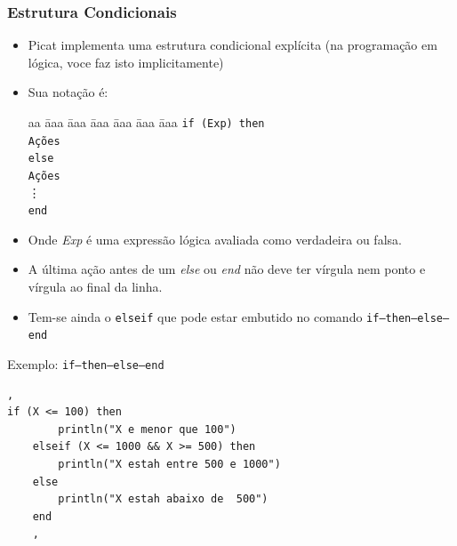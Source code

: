 \begin{frame}[fragile]
\frametitle{Estrutura Condicionais}
    
    \begin{itemize}
        
        \item Picat implementa uma  estrutura condicional explícita (na programação em lógica, voce faz isto implicitamente)
        
        \pause
        \item Sua notação é:\\
        
        \begin{tabbing}
            aa \= aaa \= aaa \= aaa \= aaa \= aaa \= aaa \kill
            \> \texttt{if (Exp) then}\\
            \> \> \texttt{Ações} \\
            \> \texttt{else}\\
            \> \> \texttt{Ações}\\
            \> \vdots\\
            \> \texttt{end} 
        \end{tabbing}
        
        \pause
        \item Onde \emph{Exp} é uma expressão lógica  avaliada como verdadeira ou  falsa.
     
     \pause   
        \item A última ação antes de um \emph{else} ou \emph{end} não deve ter  vírgula nem ponto e vírgula ao final da linha.
  
     \pause   
        \item Tem-se ainda o \texttt{elseif} que pode estar embutido no comando \texttt{if--then--else--end}
        
    \end{itemize}
\end{frame}    
    
    
\begin{frame}[fragile]

\begin{block}{Exemplo: \texttt{if--then--else--end} }
     
\begin{lstlisting}[frame=single]
    ,
if (X <= 100) then
        println("X e menor que 100")
    elseif (X <= 1000 && X >= 500) then
        println("X estah entre 500 e 1000")
    else
        println("X estah abaixo de  500")
    end
    ,
\end{lstlisting}
        
\end{block}
\end{frame}    

